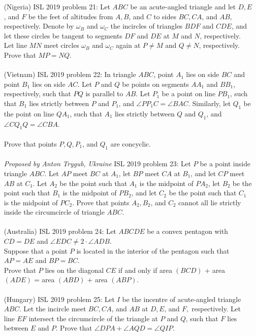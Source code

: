 (Nigeria) 
ISL 2019 problem 21:  Let $ABC$ be an acute-angled triangle and let $D, E$, and $F$ be the feet of altitudes from $A, B$, and $C$ to sides $BC, CA$, and $AB$, respectively. Denote by $\omega_B$ and $\omega_C$ the incircles of triangles $BDF$ and $CDE$, and let these circles be tangent to segments $DF$ and $DE$ at $M$ and $N$, respectively. Let line $MN$ meet circles $\omega_B$ and $\omega_C$ again at $P \ne M$ and $Q \ne N$, respectively. Prove that $MP = NQ$. \\\\
(Vietnam) 
ISL 2019 problem 22:  In triangle $ABC$, point $A_1$ lies on side $BC$ and point $B_1$ lies on side $AC$. Let $P$ and $Q$ be points on segments $AA_1$ and $BB_1$, respectively, such that $PQ$ is parallel to $AB$. Let $P_1$ be a point on line $PB_1$, such that $B_1$ lies strictly between $P$ and $P_1$, and $\angle PP_1C=\angle BAC$. Similarly, let $Q_1$ be the point on line $QA_1$, such that $A_1$ lies strictly between $Q$ and $Q_1$, and $\angle CQ_1Q=\angle CBA$. \\\\
Prove that points $P,Q,P_1$, and $Q_1$ are concyclic. \\\\
\textit{Proposed by Anton Trygub, Ukraine} 
ISL 2019 problem 23:  Let $P$ be a point inside triangle $ABC$. Let $AP$ meet $BC$ at $A_1$, let $BP$ meet $CA$ at $B_1$, and let $CP$ meet $AB$ at $C_1$. Let $A_2$ be the point such that $A_1$ is the midpoint of $PA_2$, let $B_2$ be the point such that $B_1$ is the midpoint of $PB_2$, and let $C_2$ be the point such that $C_1$ is the midpoint of $PC_2$. Prove that points $A_2, B_2$, and $C_2$ cannot all lie strictly inside the circumcircle of triangle $ABC$. \\\\
(Australia) 
ISL 2019 problem 24:  Let $ABCDE$ be a convex pentagon with $CD= DE$ and $\angle EDC \ne 2 \cdot \angle ADB$. \\
Suppose that a point $P$ is located in the interior of the pentagon such that $AP =AE$ and $BP= BC$. \\
Prove that $P$ lies on the diagonal $CE$ if and only if area $(BCD)$ + area $(ADE)$ = area $(ABD)$ + area $(ABP)$. \\\\
(Hungary) 
ISL 2019 problem 25:  Let $I$ be the incentre of acute-angled triangle $ABC$. Let the incircle meet $BC, CA$, and $AB$ at $D, E$, and $F,$ respectively. Let line $EF$ intersect the circumcircle of the triangle at $P$ and $Q$, such that $F$ lies between $E$ and $P$. Prove that $\angle DPA + \angle AQD =\angle QIP$. \\\\
